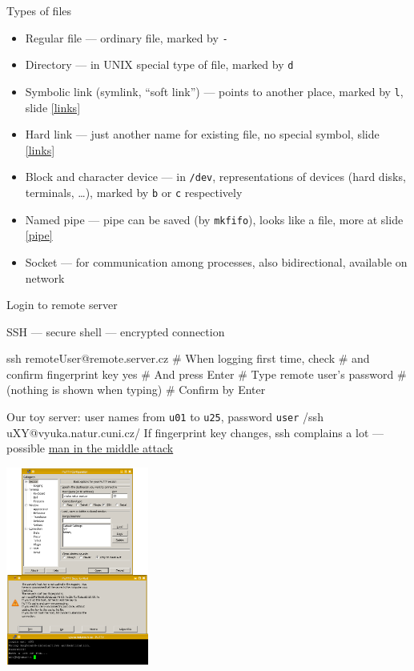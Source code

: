 \documentclass[hyperref={bookmarks=true, unicode=true, colorlinks=true, pdftitle={Linux, command line and MetaCentrum}, plainpages=false, pdfauthor={Vojtech Zeisek}, pdfsubject={Course about use of Linux command line, writing shell scripts and using MetaCentrum of CESNET}, pdfcreator={XeLaTeX, http://www.xelatex.org/}, pdfkeywords={Linux, GNU, BASH, shell, command line, MetaCentrum}, linkcolor=Sienna, anchorcolor=black, citecolor=green, filecolor=magenta, menucolor=Sienna, urlcolor=cyan, pdftex}, compress, ucs, xelatex, xcolor=svgnames, 11pt]{beamer}
\begin{document}
\begin{frame}{Types of files}
\begin{itemize}
  \item Regular file --- ordinary file, marked by \texttt{-}
  \item Directory --- in UNIX special type of file, marked by \texttt{d}
  \item Symbolic link (symlink, ``soft link'') --- points to another place, marked by \texttt{l}, slide \ref{links}
  \item Hard link --- just another name for existing file, no special symbol, slide \ref{links}
  \item Block and character device --- in \texttt{/dev}, representations of devices (hard disks, terminals, \ldots), marked by \texttt{b} or \texttt{c} respectively
  \item Named pipe --- pipe can be saved (by \texttt{mkfifo}), looks like a file, more at slide \ref{pipe}
  \item Socket --- for communication among processes, also bidirectional, available on network
\end{itemize}
\end{frame}

\begin{frame}[fragile]{Login to remote server}
\begin{multicols}{2}
  SSH --- secure shell --- encrypted connection
  \begin{bashcode}
    ssh remoteUser@remote.server.cz
    # When logging first time, check
    # and confirm fingerprint key
    yes # And press Enter
    # Type remote user's password
    # (nothing is shown when typing)
    # Confirm by Enter
  \end{bashcode}
  Our toy server: user names from \texttt{u01} to \texttt{u25}, password \texttt{user}
  \bash/ssh uXY@vyuka.natur.cuni.cz/
  If fingerprint key changes, ssh complains a lot --- possible \href{https://en.wikipedia.org/wiki/Man-in-the-middle_attack}{man in the middle attack}
  \columnbreak
  \begin{center}
    \includegraphics[height=6.5cm]{putty.png}
  \end{center}
\end{multicols}
\end{frame}
\end{document}
